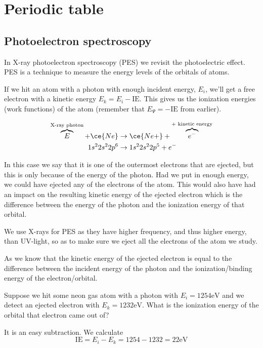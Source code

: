 \documentclass[../mit-general-chemistry.tex]{subfiles}
\begin{document}
\chapter{Periodic table}






\section{Photoelectron spectroscopy}


In X-ray photoelectron spectroscopy (PES) we revisit the photoelectric
effect. PES is a technique to measure the energy levels of the
orbitals of atoms.

If we hit an atom with a photon with enough incident energy, $E_i$,
we'll get a free electron with a kinetic energy $E_k = E_i -
\text{IE}$. This gives us the ionization energies (work functions) of
the atom (remember that $E_{\Psi} = -\text{IE}$ from earlier).

\begin{align*}
  \overbrace{E}^{\text{X-ray photon}} + \ce{Ne} &\rightarrow\ce{Ne+} + \overbrace{e^-}^{\text{+ kinetic energy}} \\
  1s^22s^22p^6 &\rightarrow 1s^22s^22p^5 + e^-\\
\end{align*}

In this case we say that it is one of the outermost electrons that are
ejected, but this is only because of the energy of the photon. Had we
put in enough energy, we could have ejected any of the electrons of
the atom. This would also have had an impact on the resulting kinetic
energy of the ejected electron which is the difference between the
energy of the photon and the ionization energy of that orbital.

We use X-rays for PES as they have higher frequency, and thus higher
energy, than UV-light, so as to make sure we eject all the electrons
of the atom we study.

As we know that the kinetic energy of the ejected electron is equal to
the difference between the incident energy of the photon and the
ionization/binding energy of the electron/orbital.


\begin{example}
  Suppose we hit some neon gas atom with a photon with $E_i =
  1254\si{\eV}$ and we detect an ejected electron with $E_k = 1232
  \si{\eV}$. What is the ionization energy of the orbital that
  electron came out of?

  It is an easy subtraction. We calculate
  \begin{equation*}
    \text{IE} = E_i - E_k = 1254 - 1232 = 22 \si{\eV}
  \end{equation*}
\end{example}
\end{document}
